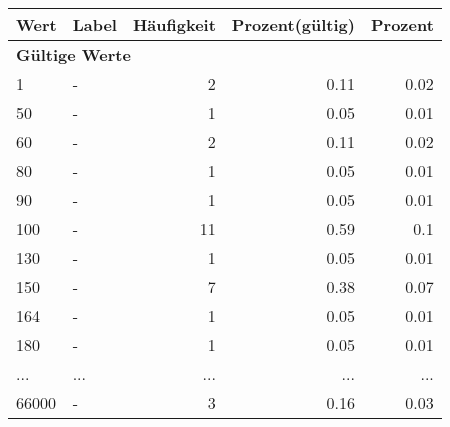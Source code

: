      \begin{longtable}{lXrrr}
     \toprule
     \textbf{Wert} & \textbf{Label} & \textbf{Häufigkeit} & \textbf{Prozent(gültig)} & \textbf{Prozent} \\
     \endhead
     \midrule
     \multicolumn{5}{l}{\textbf{Gültige Werte}}\\
        1 & \multicolumn{1}{X}{-} & %
          \num{2} &
          \num[round-mode=places,round-precision=2]{0.11} &
          \num[round-mode=places,round-precision=2]{0.02} \\
        50 & \multicolumn{1}{X}{-} & %
          \num{1} &
          \num[round-mode=places,round-precision=2]{0.05} &
          \num[round-mode=places,round-precision=2]{0.01} \\
        60 & \multicolumn{1}{X}{-} & %
          \num{2} &
          \num[round-mode=places,round-precision=2]{0.11} &
          \num[round-mode=places,round-precision=2]{0.02} \\
        80 & \multicolumn{1}{X}{-} & %
          \num{1} &
          \num[round-mode=places,round-precision=2]{0.05} &
          \num[round-mode=places,round-precision=2]{0.01} \\
        90 & \multicolumn{1}{X}{-} & %
          \num{1} &
          \num[round-mode=places,round-precision=2]{0.05} &
          \num[round-mode=places,round-precision=2]{0.01} \\
        100 & \multicolumn{1}{X}{-} & %
          \num{11} &
          \num[round-mode=places,round-precision=2]{0.59} &
          \num[round-mode=places,round-precision=2]{0.1} \\
        130 & \multicolumn{1}{X}{-} & %
          \num{1} &
          \num[round-mode=places,round-precision=2]{0.05} &
          \num[round-mode=places,round-precision=2]{0.01} \\
        150 & \multicolumn{1}{X}{-} & %
          \num{7} &
          \num[round-mode=places,round-precision=2]{0.38} &
          \num[round-mode=places,round-precision=2]{0.07} \\
        164 & \multicolumn{1}{X}{-} & %
          \num{1} &
          \num[round-mode=places,round-precision=2]{0.05} &
          \num[round-mode=places,round-precision=2]{0.01} \\
        180 & \multicolumn{1}{X}{-} & %
          \num{1} &
          \num[round-mode=places,round-precision=2]{0.05} &
          \num[round-mode=places,round-precision=2]{0.01} \\
       ... & ... & ... & ... & ... \\
        66000 & \multicolumn{1}{X}{-} & %
          \num{3} &
          \num[round-mode=places,round-precision=2]{0.16} &
          \num[round-mode=places,round-precision=2]{0.03} \\


\end{longtable}
